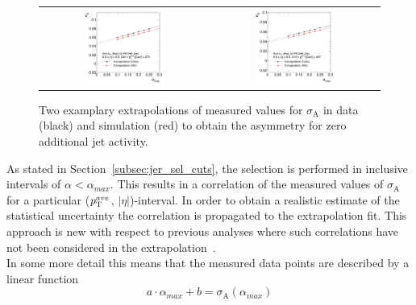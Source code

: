 \begin{figure}[!tp]
  \centering
  \begin{tabular}{cc}
                \includegraphics[width=0.49\textwidth]{figures/Extrapol_Eta0_pt4_final_nominal_v4.pdf} &
                \includegraphics[width=0.49\textwidth]{figures/Extrapol_Eta0_pt9_final_nominal_v4.pdf}
  \end{tabular}
  \caption{Two examplary extrapolations of measured values for $\sigma_\mathrm{A}$ in data (black) and simulation (red) to obtain the asymmetry for zero additional jet activity.}
  \label{fig:extrapol}
\end{figure}
As stated in Section~\ref{subsec:jer_sel_cuts}, the selection is performed in inclusive intervals of $\alpha < \alpha_{max}$. This results in a correlation of the measured values of $\sigma_\mathrm{A}$ for a particular ($p_{\text{T}}^{ave}$, $|\eta|$)-interval. In order to obtain a realistic estimate of the statistical uncertainty the correlation is propagated to the extrapolation fit. This approach is new with respect to previous analyses where such correlations have not been considered in the extrapolation~\cite{1748-0221-6-11-P11002, thesis:Schroeder, Aad:2012ag}. \\
In some more detail this means that the measured data points are described by a linear function 
\begin{equation}
 a \cdot \alpha_{max} + b = \sigma_\mathrm{A}(\alpha_{max})
\end{equation}
